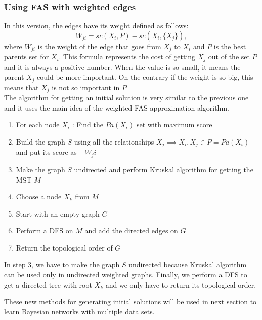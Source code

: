 \subsubsection{Using FAS with weighted edges}
\label{subsub:fasweighted}
	In this version, the edges have its weight defined as follows:
		\[ W_{ji} = {sc}( X_i , P ) - {sc}( X_i , \{ X_j \} ) ,\]
	where $W_{ji}$ is the weight of the edge that goes from $X_j$ to $X_i$ and $P$ is the best parents set for $X_i$. This formula represents the cost of getting $X_j$ out of the set $P$ and it is always a positive number. When the value is so small, it means the parent $X_j$ could be more important. On the contrary if the weight is so big, this means that $X_j$ is not so important in $P$\\
	The algorithm for getting an initial solution is very similar to the previous one and it uses the main idea of the weighted FAS approximation algorithm.
	\begin{enumerate}
		\item For each node $X_i$ : Find the ${Pa}( X_i )$ set with maximum score
		\item Build the graph $S$ using all the relationships $X_j \implies X_i, X_j \in P = {Pa}( X_i )$ and put its score as $-W_ji$
		\item Make the graph $S$ undirected and perform Kruskal algorithm for getting the MST $M$
		\item Choose a node $X_k$ from $M$
		\item Start with an empty graph $G$
		\item Perform a DFS on $M$ and add the directed edges on $G$
		\item Return the topological order of $G$
	\end{enumerate}
	In step 3, we have to make the graph $S$ undirected because Kruskal algorithm can be used only in undirected weighted graphs. Finally, we perform a DFS to get a directed tree with root $X_k$ and we only have to return its topological order.

These new methods for generating initial solutions will be used in next section to learn Bayesian networks with multiple data sets.